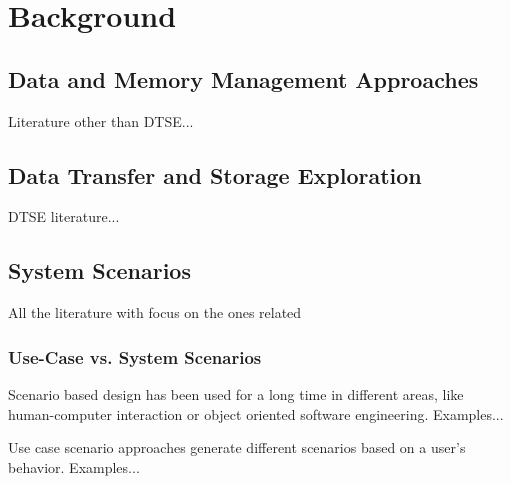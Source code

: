 \chapter{Background} %
\label{background}

\section{Data and Memory Management Approaches}
Literature other than DTSE...

\section{Data Transfer and Storage Exploration}
DTSE literature...

\section{System Scenarios}
All the literature with focus on the ones related

\subsection{Use-Case vs. System Scenarios}

Scenario based design has been used for a long time in different areas, like human-computer interaction or object oriented software engineering. 
Examples...

Use case scenario approaches generate different scenarios based on a user's behavior.
Examples...

